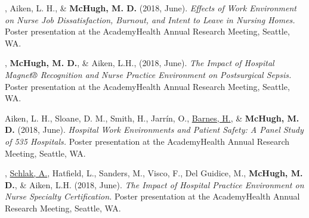\documentclass[10pt,]{article}
\begin{document}
{{{{{{{{{{{{{{{\begin{hangparas}{.25in}{1}
\end{hangparas}

\vspace{4mm}

\begin{hangparas}{.25in}{1}

, Aiken, L. H., \& {\textbf {McHugh, M. D.}} (2018, June). {\textit {Effects of Work Environment on Nurse Job Dissatisfaction, Burnout, and Intent to Leave in Nursing Homes.}} Poster presentation at the AcademyHealth Annual Research Meeting, Seattle, WA.

\end{hangparas}

\vspace{4mm}

\begin{hangparas}{.25in}{1}

, {\textbf {McHugh, M. D.}}, \& Aiken, L.H., (2018, June). {\textit {The Impact of Hospital Magnet® Recognition and Nurse Practice Environment on Postsurgical Sepsis.}} Poster presentation at the AcademyHealth Annual Research Meeting, Seattle, WA.

\end{hangparas}

\vspace{4mm}

\begin{hangparas}{.25in}{1}

\*Aiken, L. H., Sloane, D. M., Smith, H., Jarrín, O., {\underline {Barnes, H.}}, \& {\textbf {McHugh, M. D.}} (2018, June). {\textit {Hospital Work Environments and Patient Safety: A Panel Study of 535 Hospitals.}} Poster presentation at the AcademyHealth Annual Research Meeting, Seattle, WA.

\end{hangparas}

\vspace{4mm}

\begin{hangparas}{.25in}{1}

, {\underline {Schlak, A.}}, Hatfield, L., Sanders, M., Visco, F., Del Guidice, M., {\textbf {McHugh, M. D.}}, \& Aiken, L.H. (2018, June). {\textit {The Impact of Hospital Practice Environment on Nurse Specialty Certification.}} Poster presentation at the AcademyHealth Annual Research Meeting, Seattle, WA.

\end{hangparas}

}}}}}}}}}}}}}}}
\end{document}
